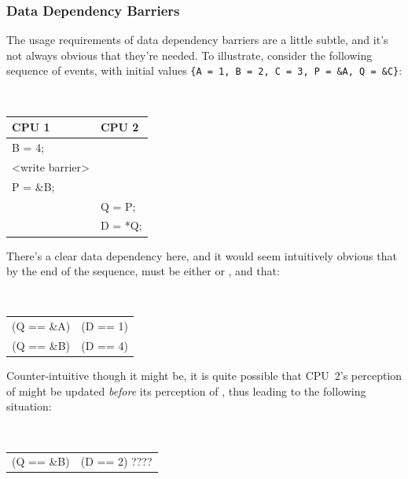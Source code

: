 \subsubsection{Data Dependency Barriers}
\label{sec:advsync:Data Dependency Barriers}

The usage requirements of data dependency barriers are a little subtle, and
it's not always obvious that they're needed.  To illustrate, consider the
following sequence of events, with initial values
{\tt \{A = 1, B = 2, C = 3, P = \&A, Q = \&C\}}:

\vspace{5pt}
\begin{minipage}[t]{\columnwidth}
\tt
\scriptsize
\begin{tabular}{l|l}
	CPU 1 &		CPU 2 \\
	\hline
	B = 4; & \\
	<write barrier> & \\
	P = \&B; &	\\
		&	Q = P; \\
		&	D = *Q; \\
\end{tabular}
\end{minipage}
\vspace{5pt}

There's a clear data dependency here, and it would seem intuitively
obvious that by the end of the sequence,  must be either 
or , and that:

\vspace{5pt}
\begin{minipage}[t]{\columnwidth}
\tt
\scriptsize
\begin{tabular}{c@{ implies }c}
	(Q == \&A) & (D == 1) \\
	(Q == \&B) & (D == 4) \\
\end{tabular}
\end{minipage}
\vspace{5pt}

Counter-intuitive though it might be, it is quite possible that
CPU~2's perception of  might be updated \emph{before} its perception
of , thus leading to the following situation:

\vspace{5pt}
\begin{minipage}[t]{\columnwidth}
\tt
\scriptsize
\begin{tabular}{c@{ and }c}
	(Q == \&B) & (D == 2) ???? \\
\end{tabular}
\end{minipage}
\vspace{5pt}

